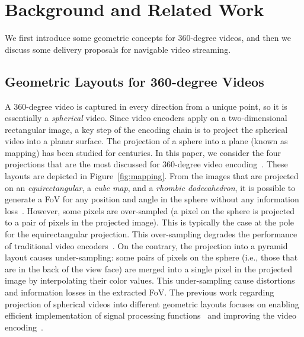\section{Background and Related Work}
\label{sec:related}

We first introduce some geometric concepts for 360-degree videos, and then we discuss
some delivery proposals for navigable video streaming.

\subsection{Geometric Layouts for 360-degree Videos}

A 360-degree video is captured in every direction from a unique 
point, so it is essentially a \emph{spherical} video. Since video encoders apply on a
two-dimensional rectangular image, a key step of the encoding chain is to project the spherical 
video into a planar
surface.
The projection of a sphere into a plane (known as mapping) has been studied
for centuries. In this paper, we consider the four projections that are the most discussed for 
360-degree video encoding~\cite{yu_framework_2015}. These layouts are depicted in 
Figure~\ref{fig:mapping}.
From
the images that are
projected on an \textit{equirectangular}, a \textit{cube map}, and a 
\textit{rhombic dodecahedron}, it is possible
to generate a \ac{FoV}
for any position and angle in the sphere without any information 
loss~\cite{Ng2005, fu_rhombic_2009}. However, some pixels
are over-sampled (a pixel on the sphere is projected to a pair of pixels in the 
projected image). This is typically the case at the pole for the equirectangular projection.
This over-sampling degrades the
performance of traditional video encoders~\cite{wojciechowski_h.264_2006,
yu_framework_2015}. 
On the
contrary, the projection into a pyramid layout causes under-sampling: some pairs of pixels 
on the sphere (i.e., those that are 
in the back of the view face) are merged into a single pixel in 
the projected image by interpolating their 
color values. This under-sampling cause distortions and information losses in the extracted 
FoV. 
The previous work regarding projection of spherical videos into different
geometric layouts focuses on enabling efficient implementation of signal processing
functions~\cite{kazhdan_metric-aware_2010} and improving the video
encoding~\cite{tosic_low_2009}. 


